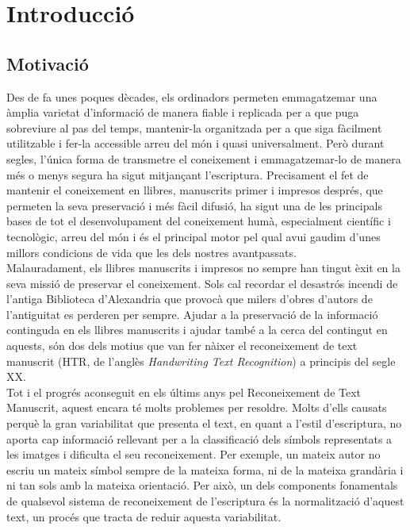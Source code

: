 \chapter{Introducció}
\label{cap:int}

\section{Motivació}
Des de fa unes poques dècades, els ordinadors permeten emmagatzemar una àmplia varietat d'informació de manera fiable i replicada per a que puga sobreviure al pas del temps, mantenir-la organitzada per a que siga fàcilment utilitzable i fer-la accessible arreu del món i quasi universalment. Però durant segles, l'única forma de transmetre el coneixement i emmagatzemar-lo de manera més o menys segura ha sigut mitjançant l'escriptura. Precisament el fet de mantenir el coneixement en llibres, manuscrits primer i impresos després, que permeten la seva preservació i més fàcil difusió, ha sigut una de les principals bases de tot el desenvolupament del coneixement humà, especialment científic i tecnològic, arreu del món i és el principal motor pel qual avui gaudim d'unes millors condicions de vida que les dels nostres avantpassats.\\

Malauradament, els llibres manuscrits i impresos no sempre han tingut èxit en la seva missió de preservar el coneixement. Sols cal recordar el desastrós incendi de l'antiga Biblioteca d'Alexandria que provocà que milers d'obres d'autors de l'antiguitat es perderen per sempre. Ajudar a la preservació de la informació continguda en els llibres manuscrits i ajudar també a la cerca del contingut en aquests, són dos dels motius que van fer nàixer el reconeixement de text manuscrit (HTR, de l'anglès \emph{Handwriting Text Recognition}) a principis del segle XX.\\

Tot i el progrés aconseguit en els últims anys pel Reconeixement de Text Manuscrit, aquest encara té molts problemes per resoldre. Molts d'ells causats perquè la gran variabilitat que presenta el text, en quant a l'estil d'escriptura, no aporta cap informació rellevant per a la classificació dels símbols representats a les imatges i dificulta el seu reconeixement. Per exemple, un mateix autor no escriu un mateix símbol sempre de la mateixa forma, ni de la mateixa grandària i ni tan sols amb la mateixa orientació. Per això, un dels components fonamentals de qualsevol sistema de reconeixement de l'escriptura és la normalització d'aquest text, un procés que tracta de reduir aquesta variabilitat.\\

